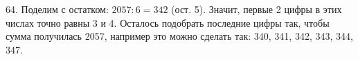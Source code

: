 64. Поделим с остатком: $2057:6=342$ (ост. 5). Значит, первые 2 цифры в этих числах точно равны 3 и 4. Осталось подобрать последние цифры так, чтобы сумма получилась 2057, например это можно сделать так: 340, 341, 342, 343, 344, 347.\\
